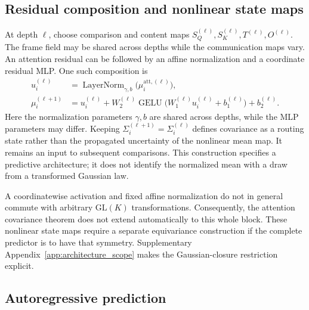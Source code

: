 \documentclass[twoside,11pt]{article}
\begin{document}
\subsection{Residual composition and nonlinear state maps}

At depth \(\ell\), choose comparison and content maps \(S_Q^{(\ell)},S_K^{(\ell)},T^{(\ell)},O^{(\ell)}\). The frame field may be shared across depths while the communication maps vary. An attention residual can be followed by an affine normalization and a coordinate residual MLP. One such composition is
\begin{align}
u_i^{(\ell)}&=\operatorname{LayerNorm}_{\gamma,b}
 \bigl(\mu_i^{\mathrm{att},(\ell)}\bigr),\\
\mu_i^{(\ell+1)}&=u_i^{(\ell)}
+W_2^{(\ell)}\operatorname{GELU}\bigl(W_1^{(\ell)}u_i^{(\ell)}+b_1^{(\ell)}\bigr)
+b_2^{(\ell)}.
\label{eq:relational_block_composition}
\end{align}
Here the normalization parameters \(\gamma,b\) are shared across depths, while the MLP parameters may differ. Keeping \(\Sigma_i^{(\ell+1)}=\Sigma_i^{(\ell)}\) defines covariance as a routing state rather than the propagated uncertainty of the nonlinear mean map. It remains an input to subsequent comparisons. This construction specifies a predictive architecture; it does not identify the normalized mean with a draw from a transformed Gaussian law.

A coordinatewise activation and fixed affine normalization do not in general commute with arbitrary \(\mathrm{GL}(K)\) transformations. Consequently, the attention covariance theorem does not extend automatically to this whole block. These nonlinear state maps require a separate equivariance construction if the complete predictor is to have that symmetry. Supplementary Appendix~\ref{app:architecture_scope} makes the Gaussian-closure restriction explicit.


\subsection{Autoregressive prediction}
\label{sec:current_algorithm}
\end{document}
